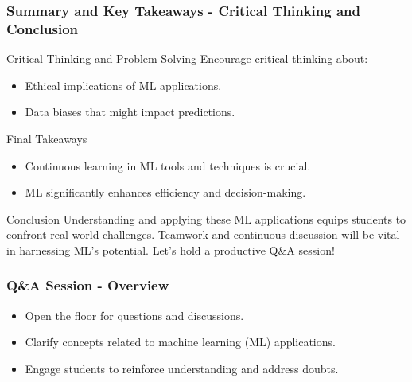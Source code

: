\documentclass[aspectratio=169]{beamer}
\begin{document}
\begin{frame}[fragile]
    \frametitle{Summary and Key Takeaways - Critical Thinking and Conclusion}
    \begin{block}{Critical Thinking and Problem-Solving}
        Encourage critical thinking about:
        \begin{itemize}
            \item Ethical implications of ML applications.
            \item Data biases that might impact predictions.
        \end{itemize}
    \end{block}
    
    \begin{block}{Final Takeaways}
        \begin{itemize}
            \item Continuous learning in ML tools and techniques is crucial.
            \item ML significantly enhances efficiency and decision-making.
        \end{itemize}
    \end{block}
    
    \begin{block}{Conclusion}
        Understanding and applying these ML applications equips students to confront real-world challenges. Teamwork and continuous discussion will be vital in harnessing ML's potential. Let's hold a productive Q\&A session!
    \end{block}
\end{frame}

\begin{frame}[fragile]
    \frametitle{Q\&A Session - Overview}
    \begin{itemize}
        \item Open the floor for questions and discussions.
        \item Clarify concepts related to machine learning (ML) applications.
        \item Engage students to reinforce understanding and address doubts.
    \end{itemize}
\end{frame}
\end{document}
